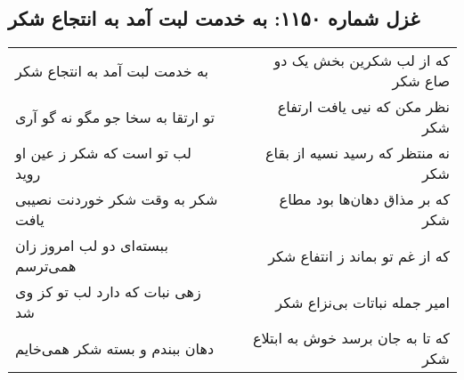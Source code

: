 \begin{center}
\section*{غزل شماره ۱۱۵۰: به خدمت لبت آمد به انتجاع شکر}
\label{sec:1150}
\begin{longtable}{l p{0.5cm} r}
به خدمت لبت آمد به انتجاع شکر
&&
که از لب شکرین بخش یک دو صاع شکر
\\
تو ارتقا به سخا جو مگو نه گو آری
&&
نظر مکن که نیی یافت ارتفاع شکر
\\
لب تو است که شکر ز عین او روید
&&
نه منتظر که رسید نسیه از بقاع شکر
\\
شکر به وقت شکر خوردنت نصیبی یافت
&&
که بر مذاق دهان‌ها بود مطاع شکر
\\
ببسته‌ای دو لب امروز زان همی‌ترسم
&&
که از غم تو بماند ز انتفاع شکر
\\
زهی نبات که دارد لب تو کز وی شد
&&
امیر جمله نباتات بی‌نزاع شکر
\\
دهان ببندم و بسته شکر همی‌خایم
&&
که تا به جان برسد خوش به ابتلاع شکر
\\
\end{longtable}
\end{center}
